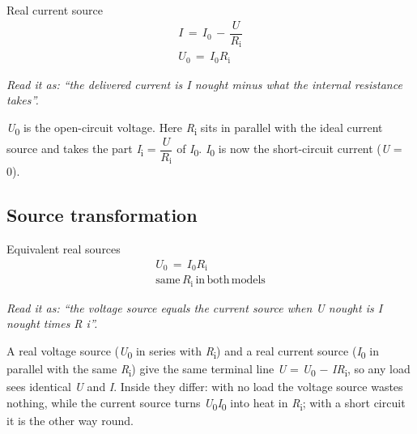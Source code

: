 \documentclass[11pt]{article}
\begin{document}
\begin{keepsection}
\begin{keepsection}
\begin{equationcard}{Real current source}
\[ \begin{gathered} {I}\, =\, {I}_{0}\, -\, \dfrac{{U}}{{R}_{\mathrm{i}}} \\ {U}_{0}\, =\, {I}_{0}{R}_{\mathrm{i}} \end{gathered} \]
{\small \emph{Read it as: “the delivered current is I nought minus what the internal resistance takes”.}\par \textit{U}\textsubscript{0} is the open-circuit voltage. Here \textit{R}\textsubscript{i} sits in parallel with the ideal current source and takes the part \textit{I}\textsubscript{i} = {\small\ensuremath{\dfrac{{U}}{{R}_{\mathrm{i}}}}} of \textit{I}\textsubscript{0}. \textit{I}\textsubscript{0} is now the short-circuit current (\textit{U} = 0).}
\end{equationcard}
\end{keepsection}

\begin{keepsection}
\subsection{Source transformation}

\begin{equationcard}{Equivalent real sources}
\[ \begin{gathered} {U}_{0}\, =\, {I}_{0}{R}_{\mathrm{i}} \\ \text{same}\, {R}_{\mathrm{i}}\, \text{in}\, \text{both}\, \text{models} \end{gathered} \]
{\small \emph{Read it as: “the voltage source equals the current source when U nought is I nought times R i”.}\par A real voltage source (\textit{U}\textsubscript{0} in series with \textit{R}\textsubscript{i}) and a real current source (\textit{I}\textsubscript{0} in parallel with the same \textit{R}\textsubscript{i}) give the same terminal line \textit{U} = \textit{U}\textsubscript{0} \ensuremath{-} \textit{I}\textit{R}\textsubscript{i}, so any load sees identical \textit{U} and \textit{I}. Inside they differ: with no load the voltage source wastes nothing, while the current source turns \textit{U}\textsubscript{0}\textit{I}\textsubscript{0} into heat in \textit{R}\textsubscript{i}; with a short circuit it is the other way round.}
\end{equationcard}
\end{keepsection}


\end{keepsection}
\end{document}
